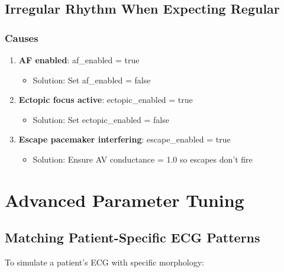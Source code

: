 \documentclass[11pt, a4paper]{article}
\begin{document}
\subsection{Irregular Rhythm When Expecting Regular}

\subsubsection{Causes}
\begin{enumerate}
    \item \textbf{AF enabled}: af\_enabled = true
        \begin{itemize}
            \item Solution: Set af\_enabled = false
        \end{itemize}
    
    \item \textbf{Ectopic focus active}: ectopic\_enabled = true
        \begin{itemize}
            \item Solution: Set ectopic\_enabled = false
        \end{itemize}
    
    \item \textbf{Escape pacemaker interfering}: escape\_enabled = true
        \begin{itemize}
            \item Solution: Ensure AV conductance = 1.0 so escapes don't fire
        \end{itemize}
\end{enumerate}

\section{Advanced Parameter Tuning}

\subsection{Matching Patient-Specific ECG Patterns}

To simulate a patient's ECG with specific morphology:
\end{document}

